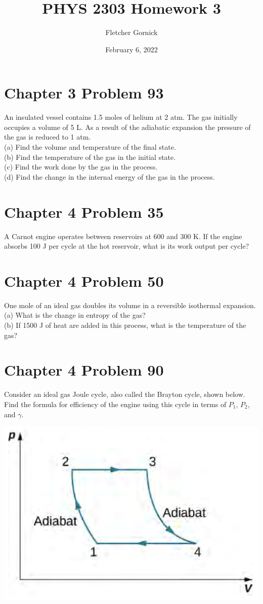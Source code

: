 \documentclass[11pt]{article}
\title{\vspace{-1.0cm}PHYS 2303 Homework 3}
\author{Fletcher Gornick}
\date{February 6, 2022}
\begin{document}
 \maketitle 
 \section*{Chapter 3 Problem 93}
 An insulated vessel contains 1.5 moles of helium at 2 atm. The gas initially occupies a 
 volume of 5 L. As a result of the adiabatic expansion the pressure of the gas is reduced 
 to 1 atm. \\

 (a) Find the volume and temperature of the final state. \\

 (b) Find the temperature of the gas in the initial state. \\

 (c) Find the work done by the gas in the process. \\

 (d) Find the change in the internal energy of the gas in the process. \\
 \newpage

 \section*{Chapter 4 Problem 35}
 A Carnot engine operates between reservoirs at 600 and 300 K. If the engine absorbs 100 J 
 per cycle at the hot reservoir, what is its work output per cycle?
 \newpage

 \section*{Chapter 4 Problem 50}
 One mole of an ideal gas doubles its volume in a reversible isothermal expansion. \\

 (a) What is the change in entropy of the gas? \\

 (b) If 1500 J of heat are added in this process, what is the temperature of the gas? \\
 \newpage

 \section*{Chapter 4 Problem 90}
 Consider an ideal gas Joule cycle, also called the Brayton cycle, shown below. Find the 
 formula for efficiency of the engine using this cycle in terms of \(P_1\), \(P_2\), and 
 \(\gamma\).

 \includegraphics[scale=0.35]{4-90.png}
\end{document}
